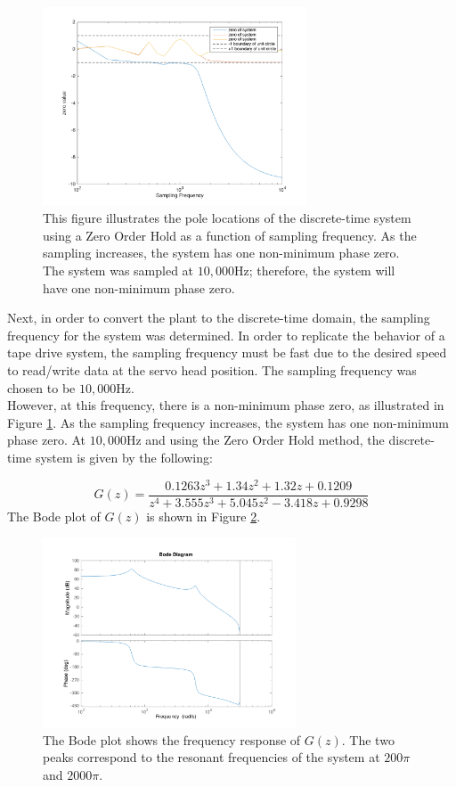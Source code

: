 \documentclass[11pt]{article}
\begin{document}
\begin{figure}[H]
    \centering
    \includegraphics[width=0.7\textwidth]{ECEN5458_SFfig.png}
    \caption{This figure illustrates the pole locations of the discrete-time system using a Zero Order Hold as a function of sampling frequency. As the sampling increases, the system has one non-minimum phase zero. The system was sampled at $10,000$Hz; therefore, the system will have one non-minimum phase zero.} 
    \label{fig:z_vs_SF}
\end{figure}
Next, in order to convert the plant to the discrete-time domain, the sampling frequency for the system was determined. In order to replicate the behavior of a tape drive system, the sampling frequency must be fast due to the desired speed to read/write data at the servo head position. The sampling frequency was chosen to be $10,000$Hz.\\
However, at this frequency, there is a non-minimum phase zero, as illustrated in Figure \ref{fig:z_vs_SF}. As the sampling frequency increases, the system has one non-minimum phase zero. At $10,000$Hz and using the Zero Order Hold method, the discrete-time system is given by the following:

\begin{equation}
    G(z) = \frac{0.1263z^{3}+1.34z^{2}+1.32z+0.1209}{z^{4}+3.555z^{3}+5.045z^{2}-3.418z+0.9298}
\end{equation}
The Bode plot of $G(z)$ is shown in Figure \ref{fig:GzBode}.

\begin{figure}[H]
    \centering
    \includegraphics[width=0.67\textwidth]{ECEN5458_project_BODE.png}
    \caption{The Bode plot shows the frequency response of $G(z)$. The two peaks correspond to the resonant frequencies of the system at $200\pi$ and $2000\pi$.} 
    \label{fig:GzBode}
\end{figure}
\end{document}
